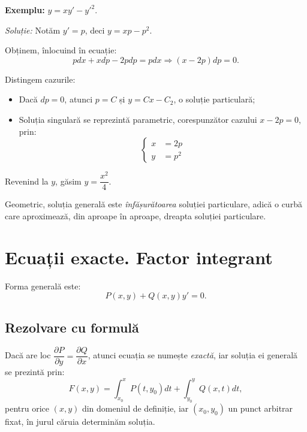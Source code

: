 \vspace{1cm}

\textbf{Exemplu:} $y = xy' - {y'}^2$.

\emph{Soluție:} Notăm $y' = p$, deci $y = xp - p^2$.

Obținem, înlocuind în ecuație:
\[
  pdx + xdp - 2pdp = pdx \Rightarrow (x - 2p) dp = 0.
\]

Distingem cazurile:
\begin{itemize}
\item Dacă $dp = 0$, atunci $p = C$ și $y = Cx - C_2$, o soluție particulară;
\item Soluția singulară se reprezintă parametric, corespunzător cazului $x - 2p = 0$, prin:
  \[
    \begin{cases}
      x &= 2p \\
      y &= p^2
    \end{cases}
  \]
\end{itemize}

Revenind la $y$, găsim $y = \dfrac{x^2}{4}$.

\begin{remark}\label{rk:infas}
  Geometric, soluția generală este \emph{înfășurătoarea} soluției particulare, adică o curbă
  care aproximează, din aproape în aproape, dreapta soluției particulare.
\end{remark}


\section{Ecuații exacte. Factor integrant}
\label{sec:exc-int}

Forma generală este:
\[
  P(x, y) + Q(x, y) y' = 0.
\]

\subsection{Rezolvare cu formulă}

Dacă are loc $\dfrac{\partial P}{\partial y} = \dfrac{\partial Q}{\partial x}$, atunci
ecuația se numește \emph{exactă}, iar soluția ei generală se prezintă prin:
\[
  F(x, y) = \int_{x_0}^x P(t, y_0) dt + \int_{y_0}^y Q(x, t) dt,
\]
pentru orice $(x, y)$ din domeniul de definiție, iar $(x_0, y_0)$ un punct arbitrar fixat,
în jurul căruia determinăm soluția.

